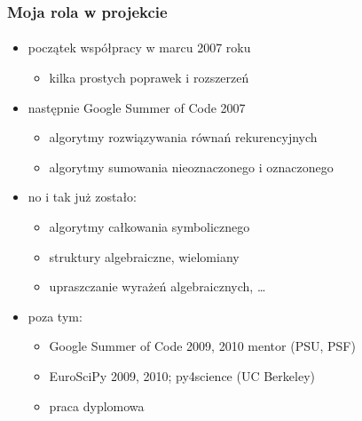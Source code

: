 \documentclass[10pt]{beamer}
\begin{document}
\begin{frame}
    \frametitle{Moja rola w projekcie}
    \framesubtitle{}

    \begin{itemize}
        \item początek współpracy w marcu 2007 roku
            \begin{itemize}
                \item kilka prostych poprawek i rozszerzeń
            \end{itemize}
            \pause
        \item następnie Google Summer of Code 2007
            \begin{itemize}
                \item algorytmy rozwiązywania równań rekurencyjnych
                \item algorytmy sumowania nieoznaczonego i oznaczonego
            \end{itemize}
            \pause
        \item no i tak już zostało:
            \begin{itemize}
                \item algorytmy całkowania symbolicznego
                \item struktury algebraiczne, wielomiany
                \item upraszczanie wyrażeń algebraicznych, \ldots
            \end{itemize}
            \pause
        \item poza tym:
            \begin{itemize}
                \item Google Summer of Code 2009, 2010 mentor (PSU, PSF)
                \item EuroSciPy 2009, 2010; py4science (UC Berkeley)
                \item praca dyplomowa
            \end{itemize}
    \end{itemize}
\end{frame}
\end{document}
